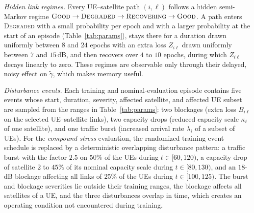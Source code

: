 \documentclass[journal]{IEEEtran}
\begin{document}
\emph{Hidden link regimes.} Every UE--satellite path $(i,\ell)$ follows a
hidden semi-Markov regime $\textsc{Good}\to\textsc{Degraded}\to\textsc{Recovering}\to\textsc{Good}$.
A path enters \textsc{Degraded} with a small probability per epoch and with a
larger probability at the start of an episode (Table~\ref{tab:params}), stays
there for a duration drawn uniformly between $8$ and $24$ epochs with an extra
loss $Z_{i\ell}$ drawn uniformly between $7$ and $15$\,dB, and then recovers
over $4$ to $10$ epochs, during which $Z_{i\ell}$ decays linearly to zero.
These regimes are observable only through their delayed, noisy effect on
$\tilde\gamma$, which makes memory useful.

\emph{Disturbance events.} Each training and nominal-evaluation episode
contains five events whose start, duration, severity, affected satellite,
and affected UE subset are sampled from the ranges in Table~\ref{tab:params}:
two blockages (extra loss $B_{i\ell}$ on the selected UE--satellite links),
two capacity drops (reduced capacity scale $\kappa_\ell$ of one satellite),
and one traffic burst (increased arrival rate $\lambda_i$ of a subset of UEs).
For the \emph{compound-stress} evaluation, the randomized training-event
schedule is replaced by a deterministic overlapping disturbance pattern: a
traffic burst with the factor $2.5$ on $50\%$ of the UEs during
$t\in[60,120)$, a capacity drop of satellite $2$ to $45\%$ of its nominal
capacity scale during $t\in[80,130)$, and an $18$-dB blockage affecting all
links of $25\%$ of the UEs during $t\in[100,125)$. The burst and blockage severities lie outside their training ranges, the
blockage affects all satellites of a UE, and the three disturbances overlap in
time, which creates an operating condition not encountered during training.
\end{document}
